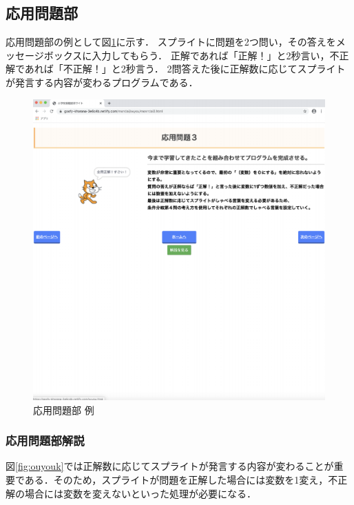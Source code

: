 \subsection{応用問題部}
応用問題部の例として図\ref{fig:ouyou}に示す．
スプライトに問題を2つ問い，その答えをメッセージボックスに入力してもらう．
正解であれば「正解！」と2秒言い，不正解であれば「不正解！」と2秒言う．
2問答えた後に正解数に応じてスプライトが発言する内容が変わるプログラムである．



\begin{figure}[h]
\begin{center}
\includegraphics[width=15cm]{ouyoutoi.pdf}
\caption{応用問題部 例}
\label{fig:ouyou}
\end{center}
\end{figure}

\newpage

\subsubsection{応用問題部解説}
図\ref{fig:ouyouk}では正解数に応じてスプライトが発言する内容が変わることが重要である．そのため，スプライトが問題を正解した場合には変数を1変え，不正解の場合には変数を変えないといった処理が必要になる．




